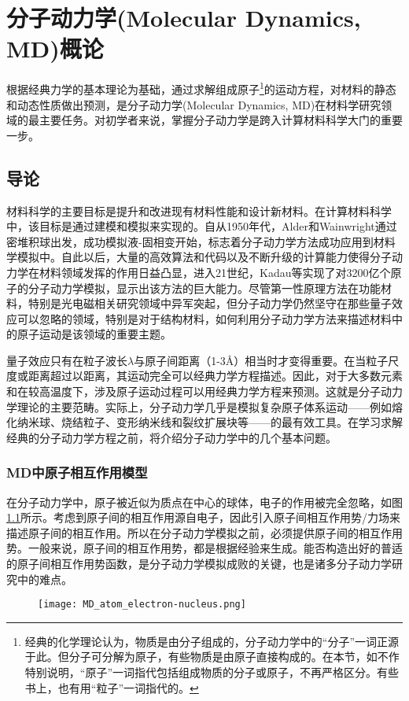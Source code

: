 \chapter{分子动力学\rm{(Molecular Dynamics, MD)}概论}\label{chapter:MD}
根据经典力学的基本理论为基础，通过求解组成原子\footnote{经典的化学理论认为，物质是由分子组成的，分子动力学中的“分子”一词正源于此。但分子可分解为原子，有些物质是由原子直接构成的。在本节，如不作特别说明，“原子”一词指代包括组成物质的分子或原子，不再严格区分。有些书上，也有用“粒子”一词指代的。}的运动方程，对材料的静态和动态性质做出预测，是分子动力学\textrm{(Molecular Dynamics, MD)}在材料学研究领域的最主要任务。对初学者来说，掌握分子动力学是跨入计算材料科学大门的重要一步。

\section{导论}
材料科学的主要目标是提升和改进现有材料性能和设计新材料。在计算材料科学中，该目标是通过建模和模拟来实现的。自从1950年代，\textrm{Alder}和\textrm{Wainwright}通过密堆积球出发，成功模拟液-固相变\cite{JCP27-1208_1957}开始，标志着分子动力学方法成功应用到材料学模拟中。自此以后，大量的高效算法和代码以及不断升级的计算能力使得分子动力学在材料领域发挥的作用日益凸显，进入21世纪，\textrm{Kadau}等实现了对3200亿个原子的分子动力学模拟\cite{IJMPC17-1755_2006}，显示出该方法的巨大能力。尽管第一性原理方法在功能材料，特别是光电磁相关研究领域中异军突起，但分子动力学仍然坚守在那些量子效应可以忽略的领域，特别是对于结构材料，如何利用分子动力学方法来描述材料中的原子运动是该领域的重要主题。

量子效应只有在粒子波长$\lambda$与原子间距离（1-3\AA）相当时才变得重要。在当粒子尺度或距离超过以距离，其运动完全可以经典力学方程描述。因此，对于大多数元素和在较高温度下，涉及原子运动过程可以用经典力学方程来预测。这就是分子动力学理论的主要范畴。实际上，分子动力学几乎是模拟复杂原子体系运动——例如熔化纳米球、烧结粒子、变形纳米线和裂纹扩展块等——的最有效工具。在学习求解经典的分子动力学方程之前，将介绍分子动力学中的几个基本问题。

\subsection{\rm{MD}中原子相互作用模型}
在分子动力学中，原子被近似为质点在中心的球体，电子的作用被完全忽略，如图\ref{MD_atoms}所示。考虑到原子间的相互作用源自电子，因此引入原子间相互作用势/力场来描述原子间的相互作用。所以在分子动力学模拟之前，必须提供原子间的相互作用势。一般来说，原子间的相互作用势，都是根据经验来生成。能否构造出好的普适的原子间相互作用势函数，是分子动力学模拟成败的关键，也是诸多分子动力学研究中的难点。
\begin{figure}[h!]
\centering
\vspace*{-0.1in}
\texttt{[image: MD\_atom\_electron-nucleus.png]}
\caption{\fontsize{7.2pt}{4.2pt}}%
\label{MD_atoms}
\end{figure}

